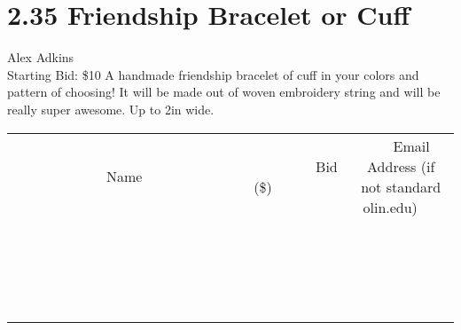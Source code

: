 \documentclass[11pt]{article}
\begin{document}
\section*{2.35 Friendship Bracelet or Cuff}
Alex Adkins
\\
Starting Bid: \$10
\newline
A handmade friendship bracelet of cuff in your colors and pattern of choosing! It will be made out of woven embroidery string and will be really super awesome. Up to 2in wide.
\\[3ex]
\begin{tabular}{c c c}
~~~~~~~~~~~~~Name~~~~~~~~~~~~~ & ~~~~~~~~~Bid (\$)~~~~~~~~~  & ~~~Email Address (if not standard olin.edu)~~~\\
 & & \\
\hline
 & & \\
\hline
 & & \\
\hline
 & & \\
\hline
 & & \\
\hline
 & & \\
\hline
 & & \\
\hline
 & & \\
\hline
 & & \\
\hline
 & & \\
\hline
 & & \\
\hline
 & & \\
\hline
 & & \\
\hline
 & & \\
\hline
 & & \\
\hline
 & & \\
\hline
 & & \\
\hline
 & & \\
\hline
 & & \\
\hline
\end{tabular}
\newpage
\end{document}
